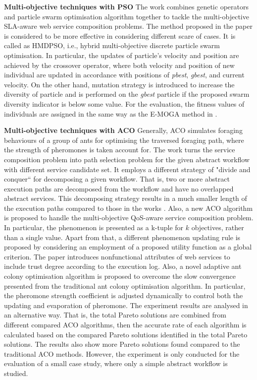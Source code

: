 \textbf{Multi-objective techniques with PSO} The work \cite{yin2014hybrid} combines genetic operators and particle swarm optimisation algorithm together to tackle the multi-objective SLA-aware web service composition problems. The method proposed in the paper  is considered to be more effective in  considering different scare of cases.  It is called as HMDPSO, i.e., hybrid multi-objective discrete particle swarm optimisation. In particular, the updates of particle's velocity and position are achieved by the crossover operator, where both velocity and position of new individual are updated in accordance with positions of \textit{pbest}, \textit{gbest}, and current velocity. On the other hand, mutation strategy is introduced to increase the diversity of particle and is performed on the \textit{gbest} particle if the proposed swarm diversity indicator is below some value. For the evaluation,  the fitness values of individuals are assigned in the same way as the E-MOGA method in \cite{wada2012e3}.

\textbf{Multi-objective techniques with ACO} Generally, ACO simulates foraging behaviours of a group of ants for optimising the traversed foraging path, where the strength of pheromones is taken account for. The work \cite{zhang2010qos} turns the service composition problem into path selection problem for the given abstract workflow with different service candidate set.  It employs a different strategy of "divide and conquer`` for decomposing a given workflow. That is,  two or more abstract execution paths are decomposed from the workflow and have no overlapped abstract services. This decomposing strategy results in a much smaller length of the execution paths compared to those in the works \cite{yu2007efficient}.  Also, a new ACO algorithm is proposed to handle the multi-objective QoS-aware service composition problem. In particular,  the phenomenon is presented as a k-tuple for $k$ objectives, rather than a single value. Apart from that, a different phenomenon updating rule is proposed by considering an employment of a proposed utility function as a global criterion. The paper \cite{wang2014novel} introduces nonfunctional attributes of web services to include trust degree according to the execution log. Also, a novel adaptive ant colony optimisation algorithm is proposed to overcome the slow convergence presented from the traditional ant colony optimisation algorithm. In particular, the pheromone strength coefficient is adjusted dynamically to control both the updating and evaporation of pheromone. The experiment results are analysed in an alternative way. That is, the total Pareto solutions are combined from different compared ACO algorithms, then the accurate rate of each algorithm is calculated based on the compared Pareto solutions identified in the total Pareto solutions. The results also show more Pareto solutions found compared to the traditional ACO methods. However, the experiment is only conducted for the evaluation of a small case study, where only a simple abstract workflow is studied.

